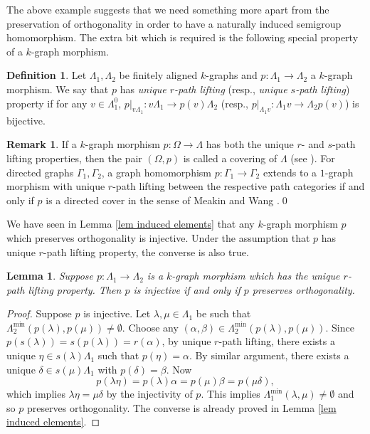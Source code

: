 \documentclass[a4paper,reqno,11pt]{amsart}
\numberwithin{equation}{section}
\newtheorem{lem}[thm]{Lemma}
\theoremstyle{definition}
\newtheorem{dfn}[thm]{Definition}
\newtheorem{rmk}[thm]{Remark}
\theoremstyle{remark}
\begin{document}
The above example suggests that we need something more apart from the preservation of orthogonality in order to have a naturally induced semigroup homomorphism. The extra bit which is required is the following special property of a $k$-graph morphism.
\begin{dfn}\label{def the range path lifting}
Let $\Lambda_1,\Lambda_2$ be finitely aligned $k$-graphs and $p:\Lambda_1\longrightarrow \Lambda_2$ a $k$-graph morphism. We say that $p$ has \emph{unique $r$-path lifting} (resp., \emph{unique $s$-path lifting}) property if for any $v\in \Lambda_1^0$, $p|_{v\Lambda_1}:v\Lambda_1\longrightarrow p(v)\Lambda_2$ (resp., $p|_{\Lambda_1v}:\Lambda_1 v\longrightarrow \Lambda_2p(v)$) is bijective.
\end{dfn}
\begin{rmk}\label{rem path lifting and covering}
If a $k$-graph morphism $p:\Omega\longrightarrow \Lambda$ has both the unique $r$- and $s$-path lifting properties, then the pair $(\Omega,p)$ is called a covering of $\Lambda$ (see \cite[Definition 2.1]{Pask}). For directed graphs $\Gamma_1,\Gamma_2$, a graph homomorphism $p:\Gamma_1\longrightarrow \Gamma_2$ extends to a $1$-graph morphism with unique $r$-path lifting between the respective path categories if and only if $p$ is a directed cover in the sense of Meakin and Wang \cite{Meakin-Wang}.\qed    
\end{rmk}
We have seen in Lemma \ref{lem induced elements} that any $k$-graph morphism $p$ which preserves orthogonality is injective. Under the assumption that $p$ has unique $r$-path lifting property, the converse is also true.
\begin{lem}\label{lem injective+path lifting imply orthogonality preservation}
Suppose $p:\Lambda_1\longrightarrow \Lambda_2$ is a $k$-graph morphism which has the unique $r$-path lifting property. Then $p$ is injective if and only if $p$ preserves orthogonality.     
\end{lem}
\begin{proof}
Suppose $p$ is injective. Let $\lambda,\mu\in \Lambda_1$ be such that $\Lambda_2^{\min}(p(\lambda),p(\mu))\neq \emptyset$. Choose any $(\alpha,\beta)\in \Lambda_2^{\min}(p(\lambda),p(\mu))$. Since $p(s(\lambda))=s(p(\lambda))=r(\alpha)$, by unique $r$-path lifting, there exists a unique $\eta\in s(\lambda)\Lambda_1$ such that $p(\eta)=\alpha$. By similar argument, there exists a unique $\delta\in s(\mu)\Lambda_1$ with $p(\delta)=\beta$. Now \[p(\lambda\eta)=p(\lambda)\alpha=p(\mu)\beta=p(\mu\delta),\] which implies $\lambda\eta=\mu\delta$ by the injectivity of $p$. This implies $\Lambda_1^{\min}(\lambda,\mu)\neq \emptyset$ and so $p$ preserves orthogonality. The converse is already proved in Lemma \ref{lem induced elements}.
\end{proof}
\end{document}
